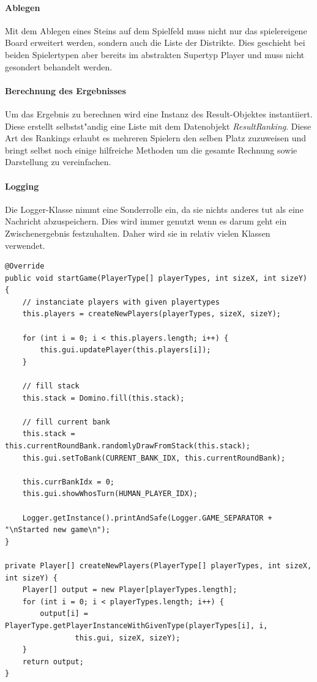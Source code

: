 \paragraph{Ablegen}
Mit dem Ablegen eines Steins auf dem Spielfeld muss nicht nur das spielereigene Board erweitert werden, sondern auch die Liste der Distrikte. Dies geschieht bei beiden Spielertypen aber bereits im abstrakten Supertyp Player und muss nicht gesondert behandelt werden. 

\paragraph{Berechnung des Ergebnisses}
Um das Ergebnis zu berechnen wird eine Instanz des Result-Objektes instantiiert. Diese erstellt selbstst"andig eine Liste mit dem Datenobjekt \emph{ResultRanking}. Diese Art des Rankings erlaubt es mehreren Spielern den selben Platz zuzuweisen und bringt selbst noch einige hilfreiche Methoden um die gesamte Rechnung sowie Darstellung zu vereinfachen. 

\paragraph{Logging}
Die Logger-Klasse nimmt eine Sonderrolle ein, da sie nichts anderes tut als eine Nachricht abzuspeichern. Dies wird immer genutzt wenn es darum geht ein Zwischenergebnis festzuhalten. Daher wird sie in relativ vielen Klassen verwendet. 

\begin{lstlisting}[style=CodeHighlighting,caption=Game - startGame,label=game_startGame]
@Override
public void startGame(PlayerType[] playerTypes, int sizeX, int sizeY) {
    // instanciate players with given playertypes
    this.players = createNewPlayers(playerTypes, sizeX, sizeY);

    for (int i = 0; i < this.players.length; i++) {
        this.gui.updatePlayer(this.players[i]);
    }

    // fill stack
    this.stack = Domino.fill(this.stack);

    // fill current bank
    this.stack = this.currentRoundBank.randomlyDrawFromStack(this.stack);
    this.gui.setToBank(CURRENT_BANK_IDX, this.currentRoundBank);

    this.currBankIdx = 0;
    this.gui.showWhosTurn(HUMAN_PLAYER_IDX);

    Logger.getInstance().printAndSafe(Logger.GAME_SEPARATOR + "\nStarted new game\n");
}

private Player[] createNewPlayers(PlayerType[] playerTypes, int sizeX, int sizeY) {
    Player[] output = new Player[playerTypes.length];
    for (int i = 0; i < playerTypes.length; i++) {
        output[i] = PlayerType.getPlayerInstanceWithGivenType(playerTypes[i], i, 
        		this.gui, sizeX, sizeY);
    }
    return output;
}
\end{lstlisting}